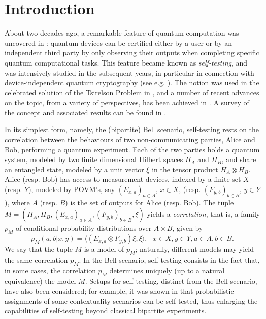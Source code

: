 \documentclass[11pt]{amsart}
\theoremstyle{definition}
\begin{document}
\section{Introduction}\label{s_intro}


About two decades ago, a remarkable feature of quantum computation was uncovered
in \cite{myao}: quantum devices can be certified
either by a user or by an independent third party by only observing 
their outputs when completing specific quantum computational tasks. 
This feature became known as \emph{self-testing}, and was intensively studied in the 
subsequent years, in particular in connection with device-independent quantum 
cryptography (see e.g. \cite{bsca-1,bsca-2,pabgms, ruv}). 
The notion was used in the celebrated solution of 
the Tsirelson Problem in \cite{jnvwy}, and 
a number of recent advances on the topic, from a variety of perspectives, has been 
achieved in \cite{broadbent, cgjv, mps, mpw, pszz, zhao}. 
A survey of the concept and associated results can be found in \cite{supic-bowles}. 

In its simplest form, namely, the (bipartite) Bell scenario, self-testing rests on the correlation between the behaviours of two non-communicating 
parties, Alice and Bob, performing a quantum experiment. 
Each of the two parties holds a quantum system, modeled by two finite dimensional 
Hilbert spaces $H_A$ and $H_B$, and share an entangled state, 
modeled by a unit vector $\xi$ in the tensor product $H_A\otimes H_B$. 
Alice (resp. Bob) has access to measurement devices, indexed by 
a finite set $X$ (resp. $Y$), modeled by 
POVM's, say $(E_{x,a})_{a\in A}$, $x\in X$,  
(resp. $(F_{y,b})_{b\in B}$, $y\in Y$), where $A$ (resp. $B$) 
is the set of outputs for Alice (resp. Bob). 
The tuple $M = (H_A,H_B,(E_{x,a})_{a\in A},(F_{y,b})_{b\in B},\xi)$
yields a \emph{correlation}, that is, a family $p_M$ of conditional 
probability distributions over $A\times B$, given by
\begin{equation}\label{eq_first}
p_M(a,b|x,y) = \langle (E_{x,a}\otimes F_{y,b})\xi,\xi\rangle, \ \ \ 
x\in X, y\in Y, a\in A, b\in B.
\end{equation}
We say that the tuple $M$ is a model of $p_M$;
naturally, different models may yield the same correlation $p_M$. 
In the Bell scenario, self-testing consists in the fact that, in some cases, the correlation $p_M$
determines uniquely (up to a natural equivalence) the model $M$. 
Setups for self-testing, distinct from the Bell scenario, have also been 
considered; for example, it was shown in \cite{brv-etal} that
probabilistic assignments of some contextuality scenarios can be 
self-tested, thus enlarging the capabilities of self-testing 
beyond classical bipartite experiments. 
\end{document}
